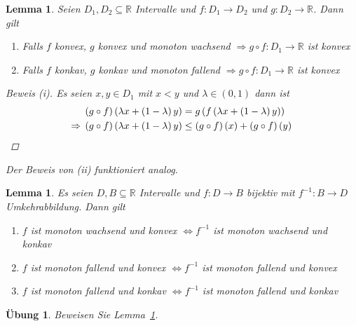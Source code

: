 \documentclass[11pt, twoside, a4paper]{article}
\theoremstyle{plain}
\newtheorem{lemma}[blockelement]{Lemma}
\newtheorem{uebung}[blockelement]{Übung}
\newcommand{\pair}[1]{\left(#1\right)}
\newcommand{\of}[1]{\left(#1\right)}
\newcommand{\equivalent}[0]{\Leftrightarrow{}}
\newcommand{\impl}[0]{\Rightarrow{}}
\newcommand{\fromto}{\rightarrow{}}
\newcommand{\sbset}{\subseteq}
\newcommand{\R}{\mathbb{R}}
\begin{document}
    \begin{lemma} %
        \label{lemma:konvex-verkettung}
        Seien $D_1, D_2\sbset\R$ Intervalle und $f: D_1\fromto D_2$ und $g: D_2\fromto \R$. Dann gilt
        \begin{enumerate}[label=(\roman*)]
            \item Falls $f$ konvex, $g$ konvex und monoton wachsend $\impl g\circ f: D_1\fromto\R$ ist konvex
            \item Falls $f$ konkav, $g$ konkav und monoton fallend $\impl g \circ f: D_1\fromto \R$ ist konvex
        \end{enumerate}

        \begin{proof}[Beweis (i)]
            Es seien $x,y\in D_1$ mit $x < y$ und $\lambda\in\pair{0,1}$ dann ist
            \begin{align*}
                \pair{g\circ f}\of{\lambda x + \pair{1-\lambda}y} &= g\of{f\of{\lambda x + \pair{1-\lambda} y}}\\
                \impl \pair{g\circ f}\of{\lambda x + \pair{1-\lambda} y} &\leq \pair{g\circ f}\of{x} + \pair{g\circ f}\of{y}\qedhere
            \end{align*}
        \end{proof}
        Der Beweis von (ii) funktioniert analog.
    \end{lemma}

    \begin{lemma} %
        \label{lemma:konvex-umkehrabbildung}
        Es seien $D, B\sbset\R$ Intervalle und $f: D\fromto B$ bijektiv mit $f^{-1}: B\fromto D$ Umkehrabbildung. Dann gilt
        \begin{enumerate}[label=(\roman*)]
            \item $f$ ist monoton wachsend und konvex $\equivalent f^{-1}$ ist monoton wachsend und konkav
            \item $f$ ist monoton fallend und konvex $\equivalent f^{-1}$ ist monoton fallend und konvex
            \item $f$ ist monoton fallend und konkav $\equivalent f^{-1}$ ist monoton fallend und konkav
        \end{enumerate}
    \end{lemma}

    \begin{uebung}
        Beweisen Sie Lemma~\ref{lemma:konvex-umkehrabbildung}.
    \end{uebung}
\end{document}
